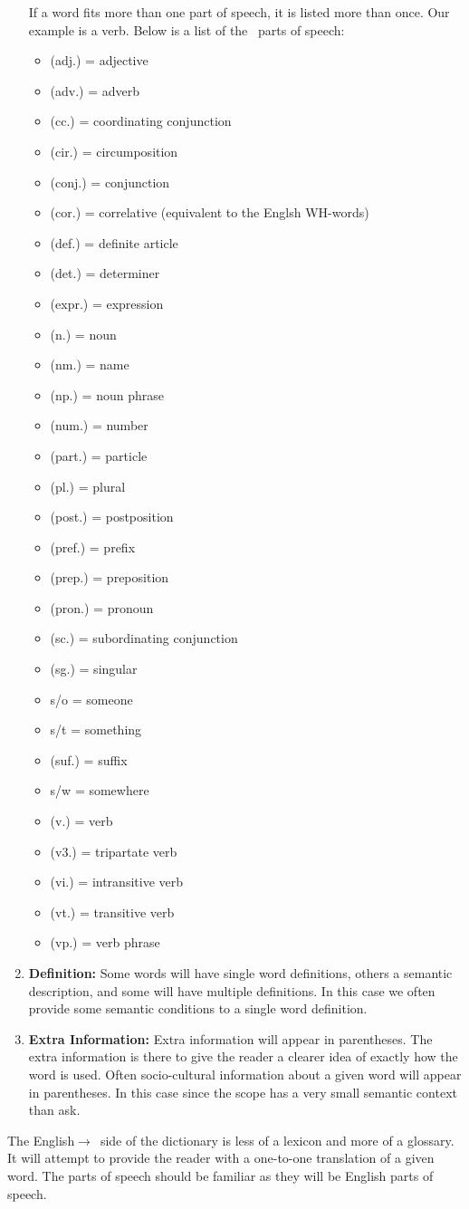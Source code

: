 \begin{enumerate}
If a word fits more than one part of speech, it is listed more than once.
Our example is a verb.
Below is a list of the \LanguageName\ parts of speech:
\begin{itemize}
\item (adj.) = adjective
\item (adv.) = adverb
\item (cc.) = coordinating conjunction	
\item (cir.) = circumposition	
\item (conj.) = conjunction	
\item (cor.) = correlative (equivalent to the Englsh WH-words)
\item (def.) = definite article
\item (det.) = determiner	
\item (expr.) = expression	
\item (n.) = noun
\item (nm.) = name	
\item (np.) = noun phrase	
\item (num.) = number
\item (part.) = particle	
\item (pl.) = plural	
\item (post.) = postposition	
\item (pref.) = prefix	
\item (prep.) = preposition
\item (pron.) = pronoun	
\item (sc.) = subordinating conjunction	
\item (sg.) = singular	
\item s/o = someone	
\item s/t = something	
\item (suf.) = suffix	
\item s/w = somewhere	
\item (v.) = verb	
\item (v3.) = tripartate verb
\item (vi.) = intransitive verb	
\item (vt.) = transitive verb	
\item (vp.) = verb phrase	
\end{itemize}
\item
\textbf{Definition:}
Some words will have single word definitions, others a semantic description, and some will have multiple definitions.
In this case we often provide some semantic conditions to a single word definition.
\item
\textbf{Extra Information:}
Extra information will appear in parentheses.
The extra information is there to give the reader a clearer idea of exactly how the word is used.
Often socio-cultural information about a given word will appear in parentheses.
In this case since the scope has a very small semantic context than ask.
\end{enumerate}

The English$\rightarrow$\LanguageName\ side of the dictionary is less of a lexicon and more of a glossary.
It will attempt to provide the reader with a one-to-one translation of a given word.
The parts of speech should be familiar as they will be English parts of speech.

